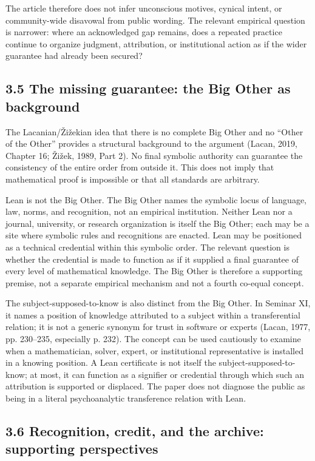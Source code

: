 \documentclass[sn-apa]{sn-jnl}
\begin{document}
The article therefore does not infer unconscious motives, cynical intent, or community-wide disavowal from public wording. The relevant empirical question is narrower: where an acknowledged gap remains, does a repeated practice continue to organize judgment, attribution, or institutional action as if the wider guarantee had already been secured?

\subsection{3.5 The missing guarantee: the Big Other as background}

The Lacanian/Žižekian idea that there is no complete Big Other and no “Other of the Other” provides a structural background to the argument (Lacan, 2019, Chapter 16; Žižek, 1989, Part 2). No final symbolic authority can guarantee the consistency of the entire order from outside it. This does not imply that mathematical proof is impossible or that all standards are arbitrary.

Lean is not the Big Other. The Big Other names the symbolic locus of language, law, norms, and recognition, not an empirical institution. Neither Lean nor a journal, university, or research organization is itself the Big Other; each may be a site where symbolic rules and recognitions are enacted. Lean may be positioned as a technical credential within this symbolic order. The relevant question is whether the credential is made to function as if it supplied a final guarantee of every level of mathematical knowledge. The Big Other is therefore a supporting premise, not a separate empirical mechanism and not a fourth co-equal concept.

The subject-supposed-to-know is also distinct from the Big Other. In Seminar XI, it names a position of knowledge attributed to a subject within a transferential relation; it is not a generic synonym for trust in software or experts (Lacan, 1977, pp. 230–235, especially p. 232). The concept can be used cautiously to examine when a mathematician, solver, expert, or institutional representative is installed in a knowing position. A Lean certificate is not itself the subject-supposed-to-know; at most, it can function as a signifier or credential through which such an attribution is supported or displaced. The paper does not diagnose the public as being in a literal psychoanalytic transference relation with Lean.

\subsection{3.6 Recognition, credit, and the archive: supporting perspectives}
\end{document}
